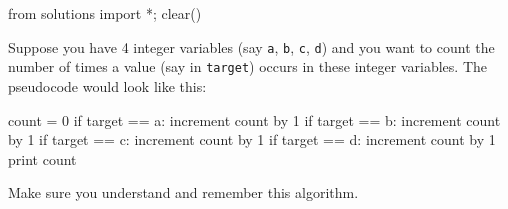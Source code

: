 \begin{python0}
from solutions import *; clear()
\end{python0}

Suppose you have 4 integer variables (say \texttt{a}, \texttt{b}, \texttt{c},
\texttt{d}) and you want to count the number of times a value (say in
\texttt{target}) occurs in these integer variables. The pseudocode would
look like this:\\
\begin{console}
count = 0
if target == a:
   increment count by 1
if target == b:
   increment count by 1
if target == c:
   increment count by 1
if target == d:
   increment count by 1
print count 
\end{console}


Make sure you understand and remember this algorithm.

